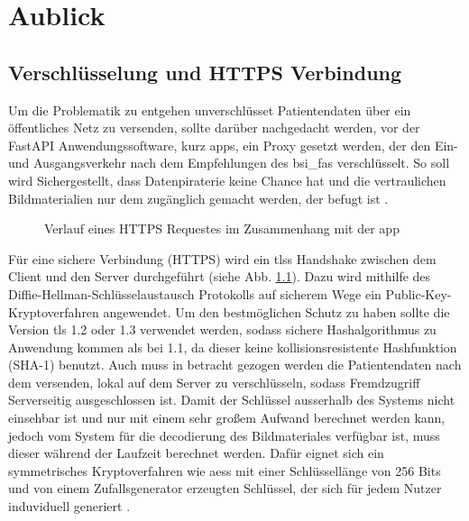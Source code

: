 \chapter{Aublick}\label{ausblick}


\section{Verschlüsselung und HTTPS Verbindung}\label{encryption}
Um die Problematik zu entgehen unverschlüsset Patientendaten über ein öffentliches Netz zu versenden, sollte darüber nachgedacht werden, vor der FastAPI Anwendungssoftware, kurz \Acp{app}, ein Proxy gesetzt werden, der den Ein- und Ausgangsverkehr nach dem Empfehlungen des \Acp{bsi_fa} verschlüsselt. So soll wird Sichergestellt, dass Datenpiraterie keine Chance hat und die vertraulichen Bildmaterialien nur dem zugänglich gemacht werden, der befugt ist \cite{fastapi} \cite{bsi}.

\begin{figure}[h]
\begin{center}
 
\caption[FastAPI HTTPS Request Verlauf]{Verlauf eines HTTPS Requestes im Zusammenhang mit der \ac{app} \cite{fastapi}}\label{cap:fastapi}
\end{center}
\end{figure}\label{fig:fastapi}

Für eine sichere Verbindung (HTTPS) wird ein \Acp{tls} Handshake zwischen dem Client und den Server durchgeführt (siehe Abb. \ref{cap:fastapi}). Dazu wird mithilfe des Diffie-Hellman-Schlüsselaustausch Protokolls auf sicherem Wege ein Public-Key-Kryptoverfahren angewendet. Um den bestmöglichen Schutz zu haben sollte die Version \ac{tls} 1.2 oder 1.3 verwendet werden, sodass sichere Hashalgorithmus zu Anwendung kommen als bei 1.1, da dieser keine kollisionsresistente Hashfunktion (SHA-1) benutzt. Auch muss in betracht gezogen werden die Patientendaten nach dem versenden, lokal auf dem Server zu verschlüsseln, sodass Fremdzugriff Serverseitig ausgeschlossen ist. Damit der Schlüssel ausserhalb des Systems nicht einsehbar ist und nur mit einem sehr großem Aufwand berechnet werden kann, jedoch vom System für die decodierung des Bildmateriales verfügbar ist, muss dieser während der Laufzeit berechnet werden. Dafür eignet sich ein symmetrisches Kryptoverfahren wie \Acp{aes} mit einer Schlüssellänge von 256 Bits und von einem Zufallsgenerator erzeugten Schlüssel, der sich für jedem Nutzer induviduell generiert \cite{bsi}.

